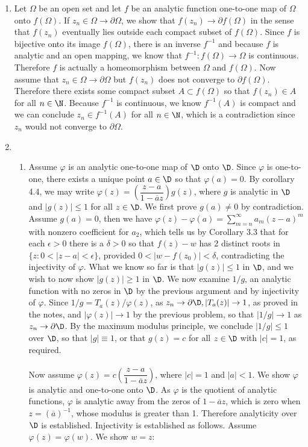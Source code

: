 \documentclass[11pt]{book}
\theoremstyle{definition}
\begin{document}
\begin{enumerate}
%
%
\item Let $\Omega$ be an open set and let $f$ be an analytic function one-to-one map of $\Omega$ onto $f(\Omega)$. If $z_n\in\Omega\to \partial\Omega$, we show that $f(z_n)\to\partial f(\Omega)$ in the sense that $f(z_n)$ eventually lies outside each compact subset of $f(\Omega)$. Since $f$ is bijective onto its image $f(\Omega)$, there is an inverse $f^{-1}$ and because $f$ is analytic and an open mapping, we know that $f^{-1}:f(\Omega)\to\Omega$ is continuous. Therefore $f$ is actually a homeomorphism between $\Omega$ and $f(\Omega)$. Now assume that $z_n\in\Omega\to\partial\Omega$ but $f(z_n)$ does not converge to $\partial f(\Omega)$. Therefore there exists some compact subset $A\subset f(\Omega)$ so that $f(z_n)\in A$ for all $n\in\N$. Because $f^{-1}$ is continuous, we know $f^{-1}(A)$ is compact and we can conclude $z_n\in f^{-1}(A)$ for all $n\in \N$, which is a contradiction since $z_n$ would not converge to $\partial \Omega$. 
%
%
\item
\begin{enumerate}
\item Assume $\varphi$ is an analytic one-to-one map of $\D$ onto $\D$. Since $\varphi$ is one-to-one, there exists a unique point $a\in \D$ so that $\varphi(a)=0$. By corollary 4.4, we may write $\varphi(z)=\left(\dfrac{z-a}{1-\overline{a}z}\right)g(z)$, where $g$ is analytic in $\D$ and $|g(z)|\leq 1$ for all $z\in\D$. We first prove $g(a)\neq 0$ by contradiction. Assume $g(a)=0$, then we have $\varphi(z)-\varphi(a)=\sum_{m=n}^\infty a_m(z-a)^m$ with  nonzero coefficient for $a_2$, which tells us by Corollary 3.3 that for each $\epsilon>0$ there is a $\delta>0$ so that $f(z)-w$ has 2 distinct roots in $\{z:0<|z-a|<\epsilon\}$, provided $0<|w-f(z_0)|<\delta$, contradicting the injectivity of $\varphi$. What we know so far is that $|g(z)|\leq 1$ in $\D$, and we wish to now show $|g(z)|\geq 1$ in $\D$. We now examine $1/g$, an analytic function with no zeros in $\D$ by the previous argument and by injectivity of $\varphi$. Since $1/g = T_a(z)/\varphi(z)$, as $z_n\to \partial\D, |T_a(z)|\to 1$, as proved in the notes, and $|\varphi(z)|\to 1$ by the previous problem, so that $|1/g|\to 1$ as $z_n\to\partial\D$. By the maximum modulus principle, we conclude $|1/g|\leq 1$ over $\D$, so that $|g|\equiv 1$, or that $g(z)=c$ for all $z\in\D$ with $|c|=1$, as required.
\\ \\
Now assume $\varphi(z)=c\left(\dfrac{z-a}{1-\overline{a}z}\right)$, where $|c|=1$ and $|a|<1$. We show $\varphi$ is analytic and one-to-one onto $\D$. As $\varphi$ is the quotient of analytic functions, $\varphi$ is analytic away from the zeros of $1-\overline{a}z$, which is zero when $z=(\overline{a})^{-1}$, whose modulus is greater than 1. Therefore analyticity over $\D$ is established. Injectivity is established as follows. Assume $\varphi(z)=\varphi(w)$. We show $w=z$:

\end{enumerate}
\end{enumerate}
\end{document}
